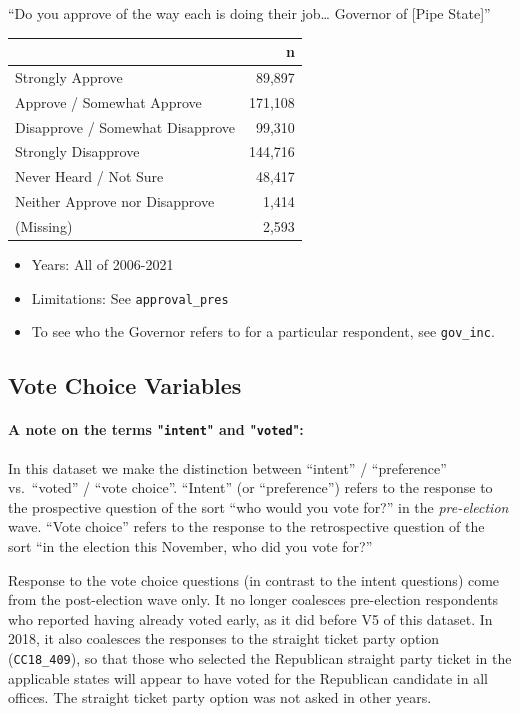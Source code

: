 \documentclass[10pt,article,oneside]{memoir}
\theoremstyle{definition}
\begin{document}
``Do you approve of the way each is doing their job\ldots{} Governor of
{[}Pipe State{]}''

\begin{table}[H]
\centering
\begin{tabular}[t]{lr}
\toprule
 & n\\
\midrule
Strongly Approve & 89,897\\
Approve / Somewhat Approve & 171,108\\
Disapprove / Somewhat Disapprove & 99,310\\
Strongly Disapprove & 144,716\\
Never Heard / Not Sure & 48,417\\
Neither Approve nor Disapprove & 1,414\\
(Missing) & 2,593\\
\bottomrule
\end{tabular}
\end{table}

\begin{itemize}
\tightlist
\item
  Years: All of 2006-2021
\item
  Limitations: See \texttt{approval\_pres}
\item
  To see who the Governor refers to for a particular respondent, see
  \texttt{gov\_inc}.
\end{itemize}

\newpage

\hypertarget{vote-choice-variables}{%
\subsection{Vote Choice Variables}\label{vote-choice-variables}}

\paragraph{A note on the terms "\texttt{intent}" and "\texttt{voted}":}

In this dataset we make the distinction between ``intent'' /
``preference'' vs.~``voted'' / ``vote choice''. ``Intent'' (or
``preference'') refers to the response to the prospective question of
the sort ``who would you vote for?'' in the \emph{pre-election} wave.
``Vote choice'' refers to the response to the retrospective question of
the sort ``in the election this November, who did you vote for?''

Response to the vote choice questions (in contrast to the intent
questions) come from the post-election wave only. It no longer coalesces
pre-election respondents who reported having already voted early, as it
did before V5 of this dataset. In 2018, it also coalesces the responses
to the straight ticket party option (\texttt{CC18\_409}), so that those
who selected the Republican straight party ticket in the applicable
states will appear to have voted for the Republican candidate in all
offices. The straight ticket party option was not asked in other years.
\end{document}
